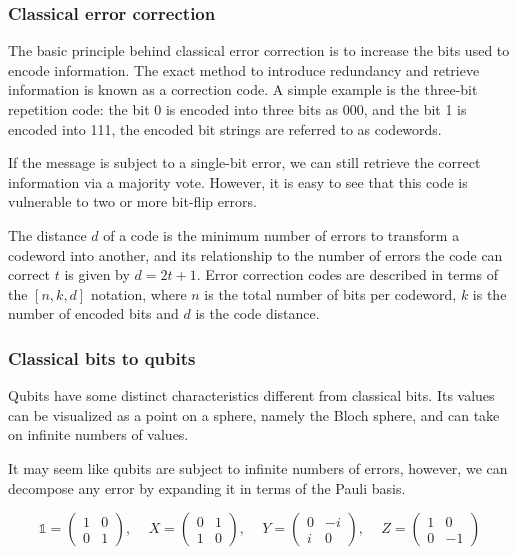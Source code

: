 \subsubsection{Classical error correction}

The basic principle behind classical error correction is to increase the bits used to encode information. The exact method to introduce redundancy and retrieve information is known as a correction code. A simple example is the three-bit repetition code: the bit 0 is encoded into three bits as 000, and the bit 1 is encoded into 111, the encoded bit strings are referred to as codewords.

If the message is subject to a single-bit error, we can still retrieve the correct information via a majority vote. However, it is easy to see that this code is vulnerable to two or more bit-flip errors.

The distance $d$ of a code is the minimum number of errors to transform a codeword into another, and its relationship to the number of errors the code can correct $t$ is given by $d=2t+1$. Error correction codes are described in terms of the $[n,k,d]$ notation, where $n$ is the total number of bits per codeword, $k$ is the number of encoded bits and $d$ is the code distance.

\subsubsection{Classical bits to qubits}

Qubits have some distinct characteristics different from classical bits. Its values can be visualized as a point on a sphere, namely the Bloch sphere, and can take on infinite numbers of values.

It may seem like qubits are subject to infinite numbers of errors, however, we can decompose any error by expanding it in terms of the Pauli basis.

\[
    \mathbb{1} =
    \begin{pmatrix}
        1 & 0 \\
        0 & 1
    \end{pmatrix}
    \text{, }
    \quad
    X =
    \begin{pmatrix}
        0 & 1 \\
        1 & 0
    \end{pmatrix}
    \text{, }
    \quad
    Y =
    \begin{pmatrix}
        0 & -i \\
        i & 0
    \end{pmatrix}
    \text{, }
    \quad
    Z =
    \begin{pmatrix}
        1 & 0  \\
        0 & -1
    \end{pmatrix}
\]

